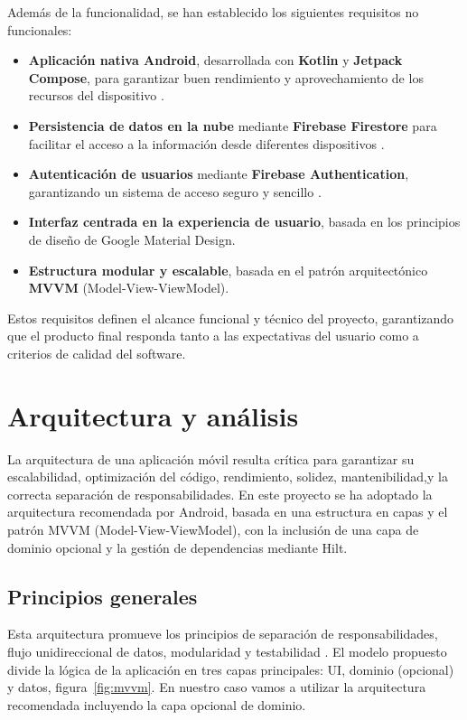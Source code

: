 Además de la funcionalidad, se han establecido los siguientes requisitos no funcionales:

\begin{itemize}
    \item \textbf{Aplicación nativa Android}, desarrollada con \textbf{Kotlin} y \textbf{Jetpack Compose}, para garantizar buen rendimiento y aprovechamiento de los recursos del dispositivo \cite{kotlin,jetpack}.
    \item \textbf{Persistencia de datos en la nube} mediante \textbf{Firebase Firestore} para facilitar el acceso a la información desde diferentes dispositivos \cite{firestore}.
    \item \textbf{Autenticación de usuarios} mediante \textbf{Firebase Authentication}, garantizando un sistema de acceso seguro y sencillo \cite{firebase-auth}.
    \item \textbf{Interfaz centrada en la experiencia de usuario}, basada en los principios de diseño de Google Material Design.
    \item \textbf{Estructura modular y escalable}, basada en el patrón arquitectónico \textbf{MVVM} (Model-View-ViewModel).
\end{itemize}

Estos requisitos definen el alcance funcional y técnico del proyecto, garantizando que el producto final responda tanto a las expectativas del usuario como a criterios de calidad del software.


\section{Arquitectura y análisis}
\label{sec:arquitectura-analisis}

La arquitectura de una aplicación móvil resulta crítica para garantizar su escalabilidad, optimización del código, rendimiento, solidez, mantenibilidad,y la correcta separación de responsabilidades. En este proyecto se ha adoptado la arquitectura recomendada por Android, basada en una estructura en capas y el patrón MVVM (Model-View-ViewModel), con la inclusión de una capa de dominio opcional y la gestión de dependencias mediante Hilt.

\subsection{Principios generales}

Esta arquitectura promueve los principios de separación de responsabilidades, flujo unidireccional de datos, modularidad y testabilidad \cite{android-architecture}. El modelo propuesto divide la lógica de la aplicación en tres capas principales: UI, dominio (opcional) y datos, figura~\ref{fig:mvvm}. En nuestro caso vamos a utilizar la arquitectura recomendada incluyendo la capa opcional de dominio.

